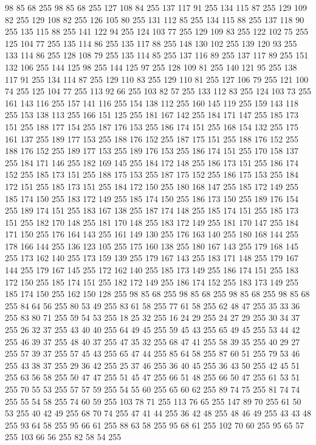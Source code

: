 98 85 68 255 98 85 68 255 127 108 84 255 137 117 91 255 134 115 87 255 129 109 82 255 129 108 82 255 126 105 80 255 131 112 85 255 134 115 88 255 137 118 90 255 135 115 88 255 141 122 94 255 124 103 77 255 129 109 83 255 122 102 75 255 125 104 77 255 135 114 86 255 135 117 88 255 148 130 102 255 139 120 93 255 133 114 86 255 128 108 79 255 135 114 85 255 137 116 89 255 137 117 89 255 151 132 106 255 144 125 98 255 144 125 97 255 128 109 81 255 140 121 95 255 138 117 91 255 134 114 87 255 129 110 83 255 129 110 81 255 127 106 79 255 121 100 74 255 125 104 77 255 113 92 66 255 103 82 57 255 133 112 83 255 124 103 73 255 161 143 116 255 157 141 116 255 154 138 112 255 160 145 119 255 159 143 118 255 153 138 113 255 166 151 125 255 181 167 142 255 184 171 147 255 185 173 151 255 188 177 154 255 187 176 153 255 186 174 151 255 168 154 132 255 175 161 137 255 189 177 153 255 188 176 152 255 187 175 151 255 188 176 152 255 188 176 152 255 189 177 153 255 189 176 153 255
186 174 151 255 170 158 137 255 184 171 146 255 182 169 145 255 184 172 148 255 186 173 151 255 186 174 152 255 185 173 151 255 188 175 153 255 187 175 152 255 186 175 153 255 184 172 151 255 185 173 151 255 184 172 150 255 180 168 147 255 185 172 149 255 185 174 150 255 183 172 149 255 185 174 150 255 186 173 150 255 189 176 154 255 189 174 151 255 183 167 138 255 187 174 148 255 185 174 151 255 185 173 151 255 182 170 148 255 181 170 148 255 183 172 149 255 181 170 147 255 184 171 150 255 176 164 143 255 161 149 130 255 176 163 140 255 180 168 144 255 178 166 144 255 136 123 105 255 175 160 138 255 180 167 143 255 179 168 145 255 173 162 140 255 173 159 139 255 179 167 143 255 183 171 148 255 179 167 144 255 179 167 145 255 172 162 140 255 185 173 149 255 186 174 151 255 183 172 150 255 185 174 151 255 182 172 149 255 186 174 152 255 183 173 149 255 185 174 150 255 162 150 128 255 98 85 68 255 98 85 68 255 98 85 68 255 98 85 68 255 84 64 56 255 80 53 49 255 83 61 58 255 77 61 58 255
62 48 47 255 35 33 36 255 83 80 71 255 59 54 53 255 18 25 32 255 16 24 29 255 24 27 29 255 30 34 37 255 26 32 37 255 43 40 40 255 64 49 45 255 59 45 43 255 65 49 45 255 53 44 42 255 46 39 37 255 48 40 37 255 47 35 32 255 68 47 41 255 58 39 35 255 40 29 27 255 57 39 37 255 57 45 43 255 65 47 44 255 85 64 58 255 87 60 51 255 79 53 46 255 43 38 37 255 29 36 42 255 25 37 46 255 36 40 45 255 36 43 50 255 42 45 51 255 63 56 58 255 50 47 47 255 51 45 47 255 66 51 48 255 66 50 47 255 61 53 51 255 70 55 53 255 57 57 59 255 54 55 60 255 65 60 62 255 89 74 75 255 81 74 74 255 55 54 58 255 74 60 59 255 103 78 71 255 113 76 65 255 147 89 70 255 61 50 53 255 40 42 49 255 68 70 74 255 47 41 44 255 36 42 48 255 48 46 49 255 43 43 48 255 93 64 58 255 95 66 61 255 88 63 58 255 95 68 61 255 102 70 60 255 95 65 57 255 103 66 56 255 82 58 54 255
